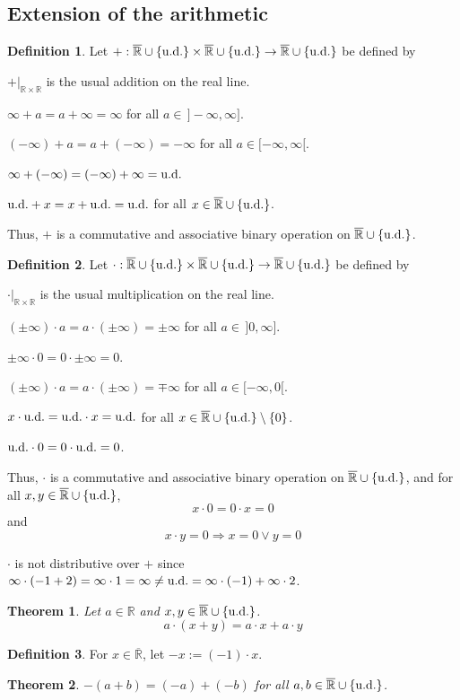 \documentclass[11pt, a4paper, openany]{book}
\newtheorem{thm}{Theorem}\newtheorem{lem}{Lemma}\newtheorem{crl}{Corollary}
\theoremstyle{definition}
\newtheorem{define}{Definition}\newtheorem{exam}{Example}\newtheorem{remark}{Remark}
\newcommand{\er}{\overline{\mathbb{R}}}
\newcommand{\ud}{\textup{u.d.}}
\newenvironment{tight_enumerate}{\begin{enumerate}\itemsep -0.2em}{\end{enumerate}}
\begin{document}
\subsection{Extension of the arithmetic}
    \begin{define}
        Let $+:\er\cup\{\ud\}\times\er\cup\{\ud\}\rightarrow \er\cup\{\ud\}$ be defined by
        \begin{tight_enumerate}
            \item $+|_{\mathbb{R}\times\mathbb{R}}$ is the usual addition on the real line.
            \item $\infty+a=a+\infty=\infty$ for all $a\in \,]\!-\!\infty,\infty]$.
            \item $(-\infty)+a=a+(-\infty)=-\infty$ for all $a\in [-\infty,\infty[$.
            \item $\infty+(-\infty)=(-\infty)+\infty=\ud$
            \item $\ud + x=x+\ud=\ud$ for all $x\in \er\cup\{\ud\}$.
        \end{tight_enumerate}
        Thus, $+$ is a commutative and associative binary operation on $\er\cup\{\ud\}$.
    \end{define}
    \begin{define}
        Let $\cdot :\er\cup\{\ud\}\times\er\cup\{\ud\}\rightarrow \er\cup\{\ud\}$ be defined by
        \begin{tight_enumerate}
            \item $\cdot|_{\mathbb{R}\times\mathbb{R}}$ is the usual multiplication on the real line.
            \item $(\pm\infty)\cdot a=a\cdot (\pm\infty)=\pm\infty$ for all $a\in\,]0,\infty]$.
            \item $\pm\infty\cdot 0=0\cdot \pm\infty=0$.
            \item $(\pm\infty)\cdot a=a\cdot (\pm\infty)=\mp\infty$ for all $a\in [-\infty,0[$.
            \item $x\cdot \ud=\ud\cdot x=\ud$ for all $x\in\er\cup\{\ud\}\setminus\{0\}$.
            \item $\ud\cdot 0=0\cdot \ud=0$.
        \end{tight_enumerate}
        Thus, $\cdot$ is a commutative and associative binary operation on $\er\cup\{\ud\}$, and for all $x,y\in \er\cup\{\ud\}$,
        \[
            x\cdot 0=0\cdot x=0
        \]
        and
        \[
            x\cdot y=0\Longrightarrow x=0\vee y=0
        \]
    \end{define}
    $\cdot$ is not distributive over $+$ since $\infty\cdot (-1+2)=\infty\cdot 1=\infty\neq \ud=\infty\cdot (-1)+\infty\cdot 2$.
    \begin{thm}
        Let $a\in\mathbb{R}$ and $x,y\in \er\cup\{\ud\}$.
        \[
            a\cdot (x+y)=a\cdot x+a\cdot y
        \]
    \end{thm}
    \begin{define}
        For $x\in\er$, let $-x:=(-1)\cdot x$.
    \end{define}
    \begin{thm}
        $-(a+b)=(-a)+(-b)$ for all $a,b\in\er\cup\{\ud\}$.
    \end{thm}
\end{document}
